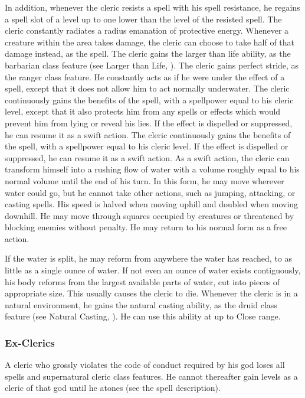 In addition, whenever the cleric resists a spell with his spell resistance, he regains a spell slot of a level up to one lower than the level of the resisted spell.
The cleric constantly radiates a \areamed radius emanation of protective energy.
Whenever a creature within the area takes damage, the cleric can choose to take half of that damage instead, as the  spell.
The cleric gains the larger than life ability, as the barbarian class feature (see Larger than Life, ).
The cleric gains perfect stride, as the ranger class feature.
He constantly acts as if he were under the effect of a  spell, except that it does not allow him to act normally underwater.
 The cleric continuously gains the benefits of the 
spell, with a spellpower equal to his cleric level, except that it also protects him from any spells or effects which would prevent him from lying or reveal his lies.
If the effect is dispelled or suppressed, he can resume it as a swift action.
 The cleric continuously gains the benefits of the 
spell, with a spellpower equal to his cleric level.
If the effect is dispelled or suppressed, he can resume it as a swift action.
As a swift action, the cleric can transform himself into a rushing flow of water with a volume roughly equal to his normal volume until the end of his turn.
In this form, he may move wherever water could go, but he cannot take other actions, such as jumping, attacking, or casting spells.
His speed is halved when moving uphill and doubled when moving downhill.
He may move through squares occupied by creatures or threatened by blocking enemies without penalty.
He may return to his normal form as a free action.
\par If the water is split, he may reform from anywhere the water has reached, to as little as a single ounce of water.
If not even an ounce of water exists contiguously, his body reforms from the largest available parts of water, cut into pieces of appropriate size.
This usually causes the cleric to die.
Whenever the cleric is in a natural environment, he gains the natural casting ability, as the druid class feature (see Natural Casting, ).
He can use this ability at up to Close range.

\subsubsection{Ex-Clerics}
A cleric who grossly violates the code of conduct required by his god loses all spells and supernatural cleric class features.
He cannot thereafter gain levels as a cleric of that god until he atones (see the  spell description).

